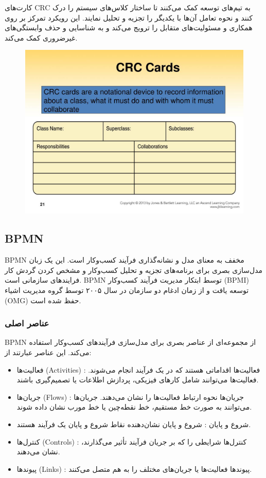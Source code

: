کارت‌های CRC به تیم‌های توسعه کمک می‌کنند تا ساختار کلاس‌های سیستم را درک کنند و نحوه تعامل آن‌ها با یکدیگر را تجزیه و تحلیل نمایند. این رویکرد تمرکز بر روی همکاری و مسئولیت‌های متقابل را ترویج می‌کند و به شناسایی و حذف وابستگی‌های غیرضروری کمک می‌کند.

\begin{figure}[H]
	\centering
	\includegraphics{pic6.jpg}
	\label{fig:label4}
\end{figure}

\subsection*{BPMN}

BPMN مخفف  به معنای مدل و نشانه‌گذاری فرآیند کسب‌وکار است. این یک زبان مدل‌سازی بصری برای برنامه‌های تجزیه و تحلیل کسب‌وکار و مشخص کردن گردش کار فرایندهای سازمانی است. BPMN توسط ابتکار مدیریت فرآیند کسب‌وکار (BPMI) توسعه یافت و از زمان ادغام دو سازمان در سال ۲۰۰۵ توسط گروه مدیریت اشیاء (OMG) حفظ شده ‌است.

\subsubsection*{عناصر اصلی}

BPMN از مجموعه‌ای از عناصر بصری برای مدل‌سازی فرآیندهای کسب‌وکار استفاده می‌کند. این عناصر عبارتند از:

\begin{itemize}
	\item فعالیت‌ها (Activities) : فعالیت‌ها اقداماتی هستند که در یک فرآیند انجام می‌شوند. فعالیت‌ها می‌توانند شامل کارهای فیزیکی، پردازش اطلاعات یا تصمیم‌گیری باشند.
	\item جریان‌ها (Flows) : جریان‌ها نحوه ارتباط فعالیت‌ها را نشان می‌دهند. جریان‌ها می‌توانند به صورت خط مستقیم، خط نقطه‌چین یا خط مورب نشان داده شوند.
	\item شروع و پایان  : شروع و پایان نشان‌دهنده نقاط شروع و پایان یک فرآیند هستند.
	\item کنترل‌ها (Controls) : کنترل‌ها شرایطی را که بر جریان فرآیند تأثیر می‌گذارند، نشان می‌دهند.
	\item پیوندها (Links) : پیوندها فعالیت‌ها یا جریان‌های مختلف را به هم متصل می‌کنند.
\end{itemize}

